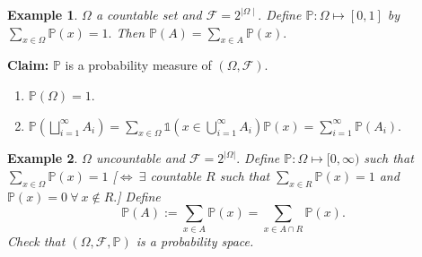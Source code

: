 \documentclass{article}
\newcommand{\1}{\mathds{1}}
\newcommand{\F}{\mathcal{F}}
\newcommand{\PB}{\mathbb{P}}
\newcommand{\lf}{\left}
\newcommand{\rg}{\right}
\newcommand{\pow}{{\vert\Omega\vert}}
\newtheorem{example}{Example}
\begin{document}
\begin{example}
    $\Omega$ a countable set and $\F=2^{\mid \Omega\mid}.$ Define $\PB:\Omega\mapsto [0,1]$ by $\sum_{x\in\Omega}\PB(x)=1.$ Then $\PB(A)=\sum_{x\in A}\PB(x).$
\end{example} 
\noindent\textbf{Claim:} $\PB$ is a probability measure of $(\Omega,\F).$ 
\begin{enumerate}
    \item $\PB(\Omega)=1.$
    \item $\PB\lf(\bigsqcup_{i=1}^\infty A_i\rg)=\sum_{x\in\Omega}\mathbb{1}\lf(x\in\bigcup_{i=1}^\infty A_i\rg)\PB(x)=\sum_{i=1}^\infty \PB(A_i).$
\end{enumerate}
\begin{example}
$\Omega$ uncountable and $\F=2^\pow.$ Define $\PB:\Omega\mapsto [0,\infty)$ such that $\sum_{x\in\Omega}\PB(x)=1$ [$\iff\ \exists$ countable $R$ such that $\sum_{x\in R}\PB(x)=1$ and $\PB(x)=0\ \forall\ x\notin R.$] Define $$\PB(A):=\sum_{x\in A}\PB(x)=\sum_{x\in A\cap R}\PB(x).$$ Check that $(\Omega,\F,\PB)$ is a probability space.
\end{example}
\end{document}
